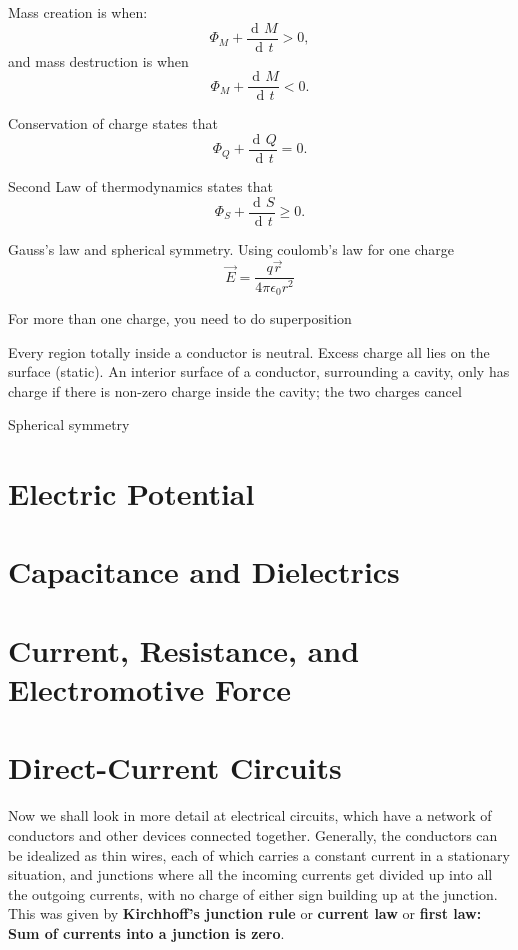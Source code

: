 \documentclass[11pt, letterpaper, titlepage]{report}
\DeclareMathOperator{\di}{d\!} %
\begin{document}
Mass creation is when:
\begin{equation}
\Phi_M + \frac{\di M}{\di t} > 0,
\end{equation}
and mass destruction is when
\begin{equation}
\Phi_M + \frac{\di M}{\di t} < 0.
\end{equation}

Conservation of charge states that
\begin{equation}
\Phi_Q + \frac{\di Q}{\di t} = 0.
\end{equation}

Second Law of thermodynamics states that
\begin{equation}
\Phi_S + \frac{\di S}{\di t} \geq 0.
\end{equation}

Gauss's law and spherical symmetry. Using coulomb's law for one charge
\begin{equation}
\vec{E} = \frac{q \vec{r}}{4 \pi \epsilon_0 r^2}
\end{equation}

For more than one charge, you need to do superposition

Every region totally inside a conductor is neutral. Excess charge all lies on the surface (static). An interior surface of a conductor, surrounding a cavity, only has charge if there is non-zero charge inside the cavity; the two charges cancel

Spherical symmetry 




\chapter{Electric Potential}
\chapter{Capacitance and Dielectrics}
\chapter{Current, Resistance, and Electromotive Force}
\chapter{Direct-Current Circuits}
Now we shall look in more detail at electrical circuits, which have a network of conductors and other devices connected together. Generally, the conductors can be idealized as thin wires, each of which carries a constant current in a stationary situation, and junctions where all the incoming currents get divided up into all the outgoing currents, with no charge of either sign building up at the junction. This was given by \textbf{Kirchhoff's junction rule} or \textbf{current law} or \textbf{first law: Sum of currents into a junction is zero}.
\end{document}
